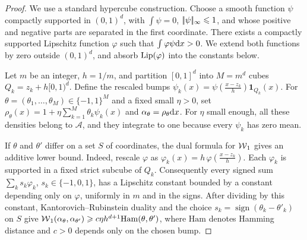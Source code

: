 \begin{proof}
	We use a standard hypercube construction. Choose a smooth function \(\psi\) compactly supported in \((0,1)^d\), with \(\int\psi=0\), \(|\!| \psi |\!|_\infty\leqslant1\), and whose positive and negative parts are separated in the first coordinate. There exists a compactly supported Lipschitz function \(\varphi\) such that \(\int\varphi\psi\mathrm{d} x>0\). We extend both functions by zero outside \((0,1)^d\), and absorb \(\operatorname{Lip}(\varphi)\) into the constants below.

	Let \(m\) be an integer, \(h=1/m\), and partition \([0,1]^d\) into \(M=m^d\) cubes \(Q_k=z_k+h[0,1)^d\). Define the rescaled bumps
	$\psi_k(x)=\psi\!\left(\frac{x-z_k}{h}\right)\mathbf 1_{Q_k}(x)$.
	For \(\theta=(\theta_1,\ldots,\theta_M)\in\{-1,1\}^M\) and a fixed small \(\eta>0\), set
	$\rho_\theta(x)=1+\eta\sum_{k=1}^M\theta_k\psi_k(x)$ and $\alpha_\theta=\rho_\theta\mathrm{d} x$.
	For \(\eta\) small enough, all these densities belong to \(\mathcal A\), and they integrate to one because every \(\psi_k\) has zero mean.

	If \(\theta\) and \(\theta'\) differ on a set \(S\) of coordinates, the dual formula for \(\operatorname{\mathcal{W}}_1\) gives an additive lower bound. Indeed, rescale \(\varphi\) as
	\(\varphi_k(x)=h\,\varphi\!\left(\frac{x-z_k}{h}\right)\).
	Each \(\varphi_k\) is supported in a fixed strict subcube of \(Q_k\). Consequently every signed sum \(\sum_k s_k\varphi_k\), \(s_k\in\{-1,0,1\}\), has a Lipschitz constant bounded by a constant depending only on \(\varphi\), uniformly in \(m\) and in the signs. After dividing by this constant, Kantorovich--Rubinstein duality and the choice \(s_k=\operatorname{sign}(\theta_k-\theta'_k)\) on \(S\) give \(\operatorname{\mathcal{W}}_1(\alpha_\theta,\alpha_{\theta'})\geqslant c\eta h^{d+1}\mathrm{Ham}(\theta,\theta')\), where \(\mathrm{Ham}\) denotes Hamming distance and \(c>0\) depends only on the chosen bump.


\end{proof}
